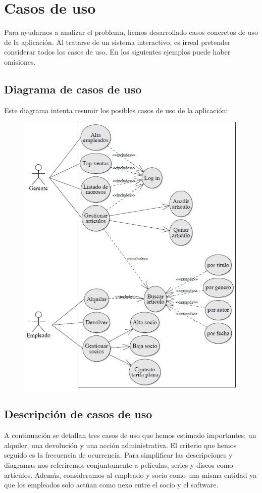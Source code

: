 \section{Casos de uso}
Para ayudarnos a analizar el problema, hemos desarrollado casos concretos de uso de la aplicación.
Al tratarse de un sistema interactivo, es irreal pretender considerar todos los casos de uso.
En los siguientes ejemplos puede haber omisiones.

\subsection{Diagrama de casos de uso}
Este diagrama intenta resumir los posibles casos de uso de la aplicación:\\
{\includegraphics[width=14cm, height=14cm, keepaspectratio]{img/example.png}\\


\subsection{Descripción de casos de uso}
A continuación se detallan tres casos de uso que hemos estimado importantes: un alquiler, una devolución y una acción administrativa. El criterio que hemos seguido es la frecuencia de ocurrencia.
Para simplificar las descripciones y diagramas nos referiremos conjuntamente a películas, series y discos como artículos. Además, consideramos al empleado y socio como una misma entidad ya que los empleados solo actúan como nexo entre el socio y el software. 

}
